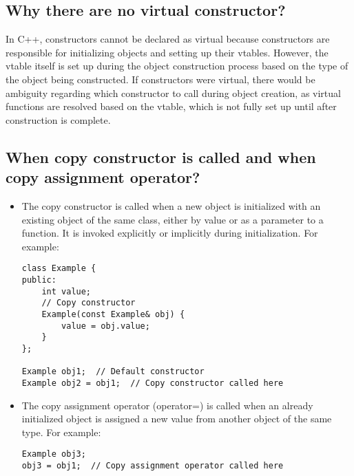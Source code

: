 \subsection{Why there are no virtual constructor?}
In C++, constructors cannot be declared as virtual because constructors are responsible for initializing objects and setting up their vtables. However, the vtable itself is set up during the object construction process based on the type of the object being constructed. If constructors were virtual, there would be ambiguity regarding which constructor to call during object creation, as virtual functions are resolved based on the vtable, which is not fully set up until after construction is complete.

\subsection{When copy constructor is called and when copy assignment operator?}
\begin{itemize}
\item The copy constructor is called when a new object is initialized with an existing object of the same class, either by value or as a parameter to a function. It is invoked explicitly or implicitly during initialization. For example:
\begin{tcolorbox}[title=Copy Constructor]
\begin{verbatim}
class Example {
public:
    int value;
    // Copy constructor
    Example(const Example& obj) {
        value = obj.value;
    }
};

Example obj1;  // Default constructor
Example obj2 = obj1;  // Copy constructor called here
\end{verbatim}
\end{tcolorbox}
\item The copy assignment operator (operator=) is called when an already initialized object is assigned a new value from another object of the same type. For example:
\begin{tcolorbox}[title=Copy Assignment Operator]
\begin{verbatim}
Example obj3;
obj3 = obj1;  // Copy assignment operator called here
\end{verbatim}
\end{tcolorbox}
\end{itemize}

